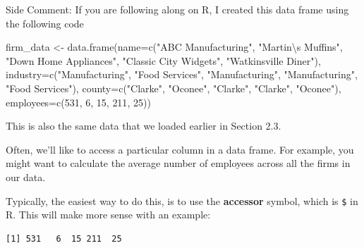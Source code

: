 \documentclass[
  letterpaper,
  DIV=11,
  numbers=noendperiod]{scrreprt}
\newenvironment{Shaded}{\begin{snugshade}}{\end{snugshade}}
\newcommand{\AttributeTok}[1]{\textcolor[rgb]{0.40,0.45,0.13}{#1}}
\newcommand{\DecValTok}[1]{\textcolor[rgb]{0.68,0.00,0.00}{#1}}
\newcommand{\FunctionTok}[1]{\textcolor[rgb]{0.28,0.35,0.67}{#1}}
\newcommand{\NormalTok}[1]{\textcolor[rgb]{0.00,0.23,0.31}{#1}}
\newcommand{\OtherTok}[1]{\textcolor[rgb]{0.00,0.23,0.31}{#1}}
\newcommand{\SpecialCharTok}[1]{\textcolor[rgb]{0.37,0.37,0.37}{#1}}
\newcommand{\StringTok}[1]{\textcolor[rgb]{0.13,0.47,0.30}{#1}}
\begin{document}
{Side Comment:} If you are following along on R, I created this data
frame using the following code

\begin{Shaded}
\begin{Highlighting}[]
\NormalTok{firm\_data }\OtherTok{\textless{}{-}} \FunctionTok{data.frame}\NormalTok{(}\AttributeTok{name=}\FunctionTok{c}\NormalTok{(}\StringTok{"ABC Manufacturing"}\NormalTok{, }\StringTok{"Martin}\SpecialCharTok{\textbackslash{}\textquotesingle{}}\StringTok{s Muffins"}\NormalTok{, }\StringTok{"Down Home Appliances"}\NormalTok{, }\StringTok{"Classic City Widgets"}\NormalTok{, }\StringTok{"Watkinsville Diner"}\NormalTok{),}
                        \AttributeTok{industry=}\FunctionTok{c}\NormalTok{(}\StringTok{"Manufacturing"}\NormalTok{, }\StringTok{"Food Services"}\NormalTok{, }\StringTok{"Manufacturing"}\NormalTok{, }\StringTok{"Manufacturing"}\NormalTok{, }\StringTok{"Food Services"}\NormalTok{),}
                        \AttributeTok{county=}\FunctionTok{c}\NormalTok{(}\StringTok{"Clarke"}\NormalTok{, }\StringTok{"Oconee"}\NormalTok{, }\StringTok{"Clarke"}\NormalTok{, }\StringTok{"Clarke"}\NormalTok{, }\StringTok{"Oconee"}\NormalTok{),}
                        \AttributeTok{employees=}\FunctionTok{c}\NormalTok{(}\DecValTok{531}\NormalTok{, }\DecValTok{6}\NormalTok{, }\DecValTok{15}\NormalTok{, }\DecValTok{211}\NormalTok{, }\DecValTok{25}\NormalTok{))}
\end{Highlighting}
\end{Shaded}

This is also the same data that we loaded earlier in Section 2.3.

Often, we'll like to access a particular column in a data frame. For
example, you might want to calculate the average number of employees
across all the firms in our data.

Typically, the easiest way to do this, is to use the \textbf{accessor}
symbol, which is \texttt{\$} in R. This will make more sense with an
example:

\begin{Shaded}
\end{Shaded}

\begin{verbatim}
[1] 531   6  15 211  25
\end{verbatim}
\end{document}
